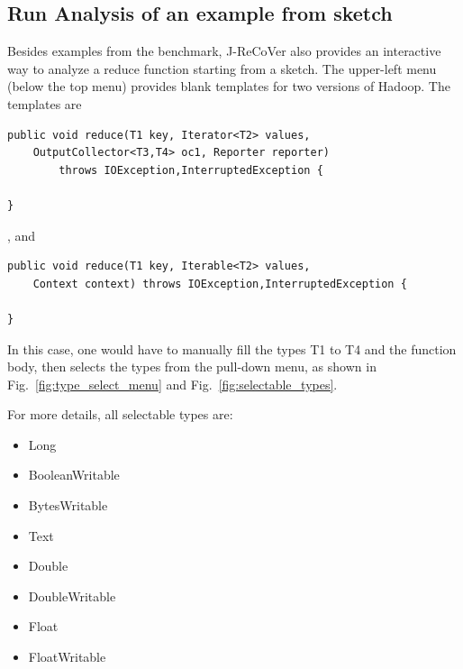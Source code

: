 \subsection{Run Analysis of an example from sketch}
\label{appendix:3}

Besides examples from the benchmark, J-ReCoVer also provides an interactive way to analyze a reduce function starting from a sketch.
The upper-left menu (below the top menu) provides blank templates for two versions of Hadoop. The templates are

\begin{mdframed}[roundcorner=5pt]
\begin{verbatim}
public void reduce(T1 key, Iterator<T2> values,
	OutputCollector<T3,T4> oc1, Reporter reporter)
		throws IOException,InterruptedException {

}
\end{verbatim}
\end{mdframed}

, and

\begin{mdframed}[roundcorner=5pt]
\begin{verbatim}
public void reduce(T1 key, Iterable<T2> values,
	Context context) throws IOException,InterruptedException {

}
\end{verbatim}
\end{mdframed}

In this case, one would have to manually fill the types T1 to T4 and the function body, then selects the types from the pull-down menu, as shown in Fig.~\ref{fig:type_select_menu} and Fig.~\ref{fig:selectable_types}.

For more details, all selectable types are:

\begin{itemize}
\item Long
\item BooleanWritable
\item BytesWritable
\item Text
\item Double
\item DoubleWritable
\item Float
\item FloatWritable
\end{itemize}
